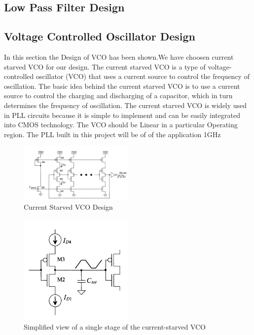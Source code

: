 \subsection{Low Pass Filter Design}
\subsection{Voltage Controlled Oscillator Design}
In this section the Design of VCO has been shown.We have choosen current starved VCO for our design. The current starved VCO is a type of voltage-controlled oscillator (VCO) that uses a current source to control the frequency of oscillation. The basic idea behind the current starved VCO is to use a current source to control the charging and discharging of a capacitor, which in turn determines the frequency of oscillation. The current starved VCO is widely used in PLL circuits because it is simple to implement and can be easily integrated into CMOS technology.
The VCO should be Linear in a particular Operating region. The PLL built in this project will be of of the application 1GHz


\begin{figure}[h]
	\centering
	\includegraphics[width=0.5\textwidth]{figs/cs_vco_design.png}
	\caption{Current Starved VCO Design}
	\label{fig:cs_vco_design}
	\vspace{0.5cm}
\end{figure}
\begin{figure}[h]
	\centering
	\includegraphics[width=0.5\textwidth]{figs/vco_simplified.png}
	\caption{Simplified view of a single stage of the current-starved VCO}
	\label{fig:vco_simplified}
\end{figure}

